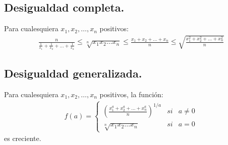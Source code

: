 \documentclass[paper=a4, fontsize=11pt, spanish]{scrartcl} %
\numberwithin{equation}{section} %
\numberwithin{figure}{section} %
\numberwithin{table}{section} %
\begin{document}
  \subsection{Desigualdad completa.}
    Para cualesquiera $x_1,x_2,\dots,x_n$ positivos:
    \begin{align}
      \frac{n}{\frac{1}{x_1} + \frac{1}{x_2} + \dots + \frac{1}{x_n}} \leq \sqrt[n]{x_1x_2 \dots x_n} \leq \frac{x_1+x_2+\dots+x_n}{n} \leq \sqrt{\frac{x_1^2+x_2^2+\dots+x_n^2}{n}}
    \end{align}
    
  \subsection{Desigualdad generalizada.}  
    Para cualesquiera $x_1,x_2,\dots,x_n$ positivos, la función:
    \begin{align}
     f(a) = \left\{ \begin{matrix} \left(\frac{x_1^a+x_2^a+\dots+x_n^a}{n}\right)^{1/a} & si & a \neq 0 \\ \displaystyle \sqrt[n]{x_1x_2 \dots x_n} & si & a = 0\end{matrix} \right.
    \end{align}
    es creciente. \\

    
\end{document}
